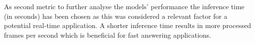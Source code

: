 As second metric to further analyse the models' performance the inference time (in seconds) has been chosen as this was considered a relevant factor for a potential real-time application. A shorter inference time results in more processed frames per second which is beneficial for fast answering applications.





